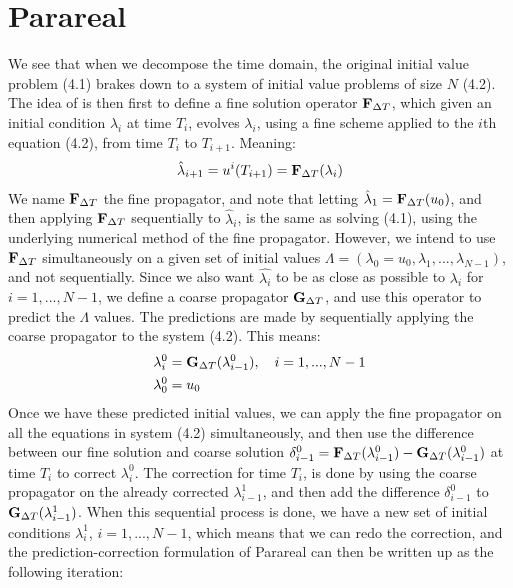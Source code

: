 \section{Parareal}\label{Parareal_sec}
We see that when we decompose the time domain, the original initial value problem (4.1) brakes down to a system of initial value problems of size $N$ (4.2). The idea of \cite{baffico2002parallel} is then first to define a fine solution operator $\bold F_{\Delta T}$, which given an initial condition $\lambda_i$ at time $T_i$, evolves $\lambda_i$, using a fine scheme applied to the $i$th equation (4.2), from time $T_i$ to $T_{i+1}$. Meaning:
\begin{align*}
\hat \lambda_{i+1}= u^i(T_{i+1})=\bold F_{\Delta T}(\lambda_i)
\end{align*} 
We name $\bold F_{\Delta T}$ the fine propagator, and note that letting $\hat \lambda_{1}=\bold F_{\Delta T}(u_0)$, and then applying $\bold F_{\Delta T}$ sequentially to $\hat \lambda_{i}$, is the same as solving (4.1), using the underlying numerical method of the fine propagator. However, we intend to use $\bold F_{\Delta T}$ simultaneously on a given set of initial values $\Lambda=(\lambda_0=u_0,\lambda_1,...,\lambda_{N-1})$, and not sequentially. Since we also want $\hat{\lambda_i}$ to be as close as possible to $\lambda_i$ for $i=1,...,N-1$, we define a coarse propagator $\bold G_{\Delta T}$, and use this operator to predict the $\Lambda$ values. The predictions are made by sequentially applying the coarse propagator to the system (4.2). This means:
\begin{align}
\lambda_i^0 &= \bold G_{\Delta T}(\lambda_{i-1}^0),\quad i=1,...,N-1 \\
\lambda_0^0&=u_0
\end{align} 
Once we have these predicted initial values, we can apply the fine propagator on all the equations in system (4.2) simultaneously, and then use the difference between our fine solution  and coarse solution $\delta_{i-1}^0= \bold F_ {\Delta T}( \lambda_{i-1}^0)-\bold G_ {\Delta T}( \lambda_{i-1}^0)$ at time $T_i$ to correct $\lambda_i^0$. The correction for time $T_i$, is done by using the coarse propagator on the already corrected $\lambda_{i-1}^1$, and then add the difference $\delta_{i-1}^0$ to $\bold G_ {\Delta T}(\lambda_{i-1}^1)$. When this sequential process is done, we have a new set of initial conditions $\lambda_i^1$, $i=1,...,N-1$, which means that we can redo the correction, and the prediction-correction formulation of Parareal can then be written up as the following iteration:
